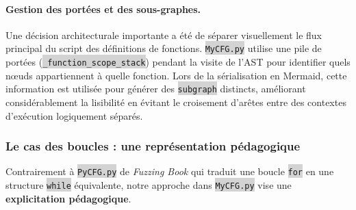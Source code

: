 \documentclass[11pt,a4paper]{article}
\newcommand{\code}[1]{\colorbox{lightgray}{\texttt{\small #1}}}
\begin{document}
\paragraph{Gestion des portées et des sous-graphes.} Une décision architecturale importante a été de séparer visuellement le flux principal du script des définitions de fonctions. \code{MyCFG.py} utilise une pile de portées (\code{\_function\_scope\_stack}) pendant la visite de l'AST pour identifier quels nœuds appartiennent à quelle fonction. Lors de la sérialisation en Mermaid, cette information est utilisée pour générer des \code{subgraph} distincts, améliorant considérablement la lisibilité en évitant le croisement d'arêtes entre des contextes d'exécution logiquement séparés.

\subsubsection{Le cas des boucles : une représentation pédagogique}

Contrairement à \code{PyCFG.py} de \textit{Fuzzing Book} qui traduit une boucle \code{for} en une structure \code{while}
 équivalente, notre approche dans \code{MyCFG.py} vise une \textbf{explicitation pédagogique}.
 
\end{document}
